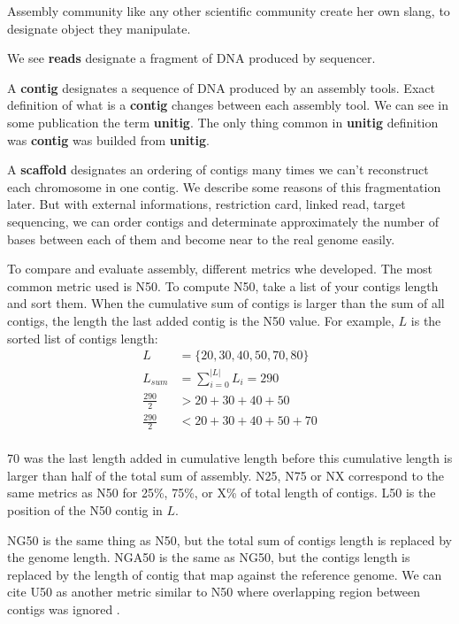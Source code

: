 \documentclass[./main.tex]{subfiles}
\begin{document}
Assembly community like any other scientific community create her own slang, to designate object they manipulate.

We see \textbf{reads} designate a fragment of DNA produced by sequencer.

A \textbf{contig} designates a sequence of DNA produced by an assembly tools. Exact definition of what is a \textbf{contig} changes between each assembly tool. We can see in some publication the term \textbf{unitig}. The only thing common in \textbf{unitig} definition was \textbf{contig} was builded from \textbf{unitig}.

A \textbf{scaffold} designates an ordering of contigs many times we can't reconstruct each chromosome in one contig. We describe some reasons of this fragmentation later. But with external informations, restriction card, linked read, target sequencing, we can order contigs and determinate approximately the number of bases between each of them and become near to the real genome easily.

To compare and evaluate assembly, different metrics whe developed. The most common metric used is N50.
To compute N50, take a list of your contigs length and sort them. When the cumulative sum of contigs is larger than the sum of all contigs, the length the last added contig is the N50 value. For example, $L$ is the sorted list of contigs length: 
\begin{equation}
\begin{aligned}
L &= \{20, 30, 40, 50, 70, 80\} \\
L_{sum} &= \sum\limits_{i=0}^{|L|} L_i = 290 \\
\frac{290}{2} &> 20 + 30 + 40 + 50 \\
\frac{290}{2} &< 20 + 30 + 40 + 50 + 70\\
\end{aligned}
\end{equation}

70 was the last length added in cumulative length before this cumulative length is larger than half of the total sum of assembly. N25, N75 or NX correspond to the same metrics as N50 for 25\%, 75\%, or X\% of total length of contigs. L50 is the position of the N50 contig in $L$.

NG50 is the same thing as N50, but the total sum of contigs length is replaced by the genome length. NGA50 is the same as NG50, but the contigs length is replaced by the length of contig that map against the reference genome. We can cite U50 as another metric similar to N50 where overlapping region between contigs was ignored \cite{U50}.
\end{document}
